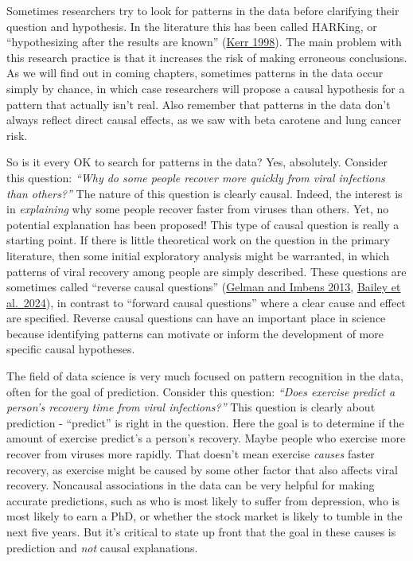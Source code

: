 \documentclass[
]{book}
\begin{document}
Sometimes researchers try to look for patterns in the data before clarifying their question and hypothesis. In the literature this has been called HARKing, or ``hypothesizing after the results are known'' (\href{https://journals.sagepub.com/doi/abs/10.1207/s15327957pspr0203_4}{Kerr 1998}). The main problem with this research practice is that it increases the risk of making erroneous conclusions. As we will find out in coming chapters, sometimes patterns in the data occur simply by chance, in which case researchers will propose a causal hypothesis for a pattern that actually isn't real. Also remember that patterns in the data don't always reflect direct causal effects, as we saw with beta carotene and lung cancer risk.

So is it every OK to search for patterns in the data? Yes, absolutely. Consider this question: \emph{``Why do some people recover more quickly from viral infections than others?''} The nature of this question is clearly causal. Indeed, the interest is in \emph{explaining} why some people recover faster from viruses than others. Yet, no potential explanation has been proposed! This type of causal question is really a starting point. If there is little theoretical work on the question in the primary literature, then some initial exploratory analysis might be warranted, in which patterns of viral recovery among people are simply described. These questions are sometimes called ``reverse causal questions'' (\href{https://www.nber.org/papers/w19614}{Gelman and Imbens 2013}, \href{https://www.nature.com/articles/s41562-024-01939-z}{Bailey et al.~2024}), in contrast to ``forward causal questions'' where a clear cause and effect are specified. Reverse causal questions can have an important place in science because identifying patterns can motivate or inform the development of more specific causal hypotheses.

The field of data science is very much focused on pattern recognition in the data, often for the goal of prediction. Consider this question: \emph{``Does exercise predict a person's recovery time from viral infections?''} This question is clearly about prediction - ``predict'' is right in the question. Here the goal is to determine if the amount of exercise predict's a person's recovery. Maybe people who exercise more recover from viruses more rapidly. That doesn't mean exercise \emph{causes} faster recovery, as exercise might be caused by some other factor that also affects viral recovery. Noncausal associations in the data can be very helpful for making accurate predictions, such as who is most likely to suffer from depression, who is most likely to earn a PhD, or whether the stock market is likely to tumble in the next five years. But it's critical to state up front that the goal in these causes is prediction and \emph{not} causal explanations.
\end{document}
